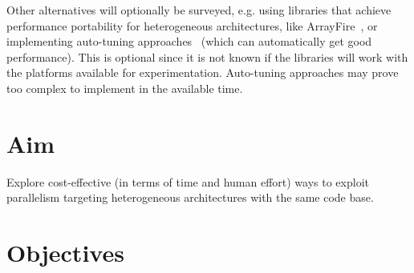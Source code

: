 
Other alternatives will optionally be surveyed, e.g. using libraries that achieve performance portability for heterogeneous architectures, like ArrayFire~\cite{malcolm2012arrayfire}, or implementing auto-tuning approaches~\cite{ganapathi2009case} (which can automatically get good performance). This is optional since it is not known if the libraries will work with the platforms available for experimentation. Auto-tuning approaches may prove too complex to implement in the available time.\\

\section{Aim}
\label{sec:aim}

Explore cost-effective (in terms of time and human effort) ways to exploit parallelism targeting heterogeneous architectures with the same code base.

\section{Objectives}

